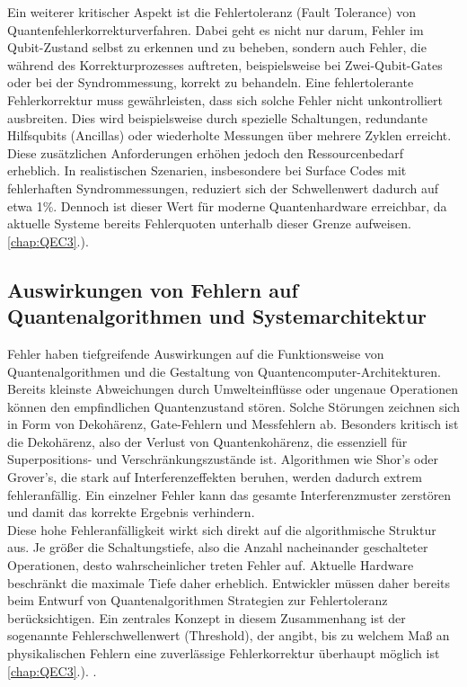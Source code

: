 Ein weiterer kritischer Aspekt ist die Fehlertoleranz (Fault Tolerance) von Quantenfehlerkorrekturverfahren. Dabei geht es nicht nur darum, Fehler im Qubit-Zustand selbst zu erkennen und zu beheben, sondern auch Fehler, die während des Korrekturprozesses auftreten, beispielsweise bei Zwei-Qubit-Gates oder bei der Syndrommessung, korrekt zu behandeln. Eine fehlertolerante Fehlerkorrektur muss gewährleisten, dass sich solche Fehler nicht unkontrolliert ausbreiten. Dies wird beispielsweise durch spezielle Schaltungen, redundante Hilfsqubits (Ancillas) oder wiederholte Messungen über mehrere Zyklen erreicht. Diese zusätzlichen Anforderungen erhöhen jedoch den Ressourcenbedarf erheblich. In realistischen Szenarien, insbesondere bei Surface Codes mit fehlerhaften Syndrommessungen, reduziert sich der Schwellenwert dadurch auf etwa 1\%. Dennoch ist dieser Wert für moderne Quantenhardware erreichbar, da aktuelle Systeme bereits Fehlerquoten unterhalb dieser Grenze aufweisen.\ref{chap:QEC3}.). \cite[Seite 13-15]{roffe_Quantum_error_correction_2019} 

\subsection{Auswirkungen von Fehlern auf Quantenalgorithmen und Systemarchitektur}
Fehler haben tiefgreifende Auswirkungen auf die Funktionsweise von Quantenalgorithmen und die Gestaltung von Quantencomputer-Architekturen. Bereits kleinste Abweichungen durch Umwelteinflüsse oder ungenaue Operationen können den empfindlichen Quantenzustand stören. Solche Störungen zeichnen sich in Form von Dekohärenz, Gate-Fehlern und Messfehlern ab. Besonders kritisch ist die Dekohärenz, also der Verlust von Quantenkohärenz, die essenziell für Superpositions- und Verschränkungszustände ist. Algorithmen wie Shor’s oder Grover’s, die stark auf Interferenzeffekten beruhen, werden dadurch extrem fehleranfällig. Ein einzelner Fehler kann das gesamte Interferenzmuster zerstören und damit das korrekte Ergebnis verhindern. \cite[Seite 381-385]{nielsen_quantum_2010}\\

Diese hohe Fehleranfälligkeit wirkt sich direkt auf die algorithmische Struktur aus. Je größer die Schaltungstiefe, also die Anzahl nacheinander geschalteter Operationen, desto wahrscheinlicher treten Fehler auf. Aktuelle Hardware beschränkt die maximale Tiefe daher erheblich. Entwickler müssen daher bereits beim Entwurf von Quantenalgorithmen Strategien zur Fehlertoleranz berücksichtigen. Ein zentrales Konzept in diesem Zusammenhang ist der sogenannte Fehlerschwellenwert (Threshold), der angibt, bis zu welchem Maß an physikalischen Fehlern eine zuverlässige Fehlerkorrektur überhaupt möglich ist \ref{chap:QEC3}.). \cite[Seite 293-308]{rieffel_eleanor_g_and_wolfgang_h_polak_quantum_2011}.

